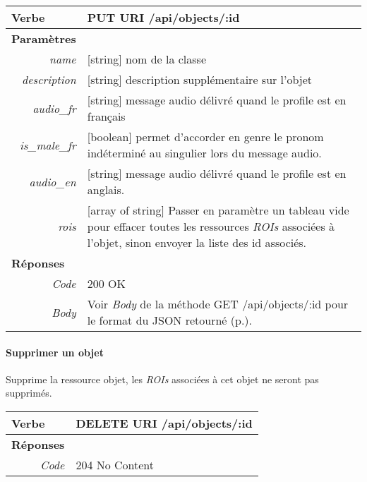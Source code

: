 \begin{appendices}
\begin{absolutelynopagebreak}
\begin{tabular}{@{}p{2cm}p{11.5cm}@{}}
    \toprule
    \textbf{Verbe}                        & PUT \hspace{2.5cm} \textbf{URI} \hspace{0.25cm} /api/objects/:id   \\ \midrule
    \textbf{Paramètres}                   &        \\
    \multicolumn{1}{r}{\textit{name}} & [string] nom de la classe  \\ 
    \multicolumn{1}{r}{\textit{description}} & [string] description supplémentaire sur l'objet  \\ 
    \multicolumn{1}{r}{\textit{audio\_fr}} & [string] message audio délivré quand le profile est en français \\ 
    \multicolumn{1}{r}{\textit{is\_male\_fr}} & [boolean] permet d'accorder en genre le pronom indéterminé au singulier lors du message audio.   \\
    \multicolumn{1}{r}{\textit{audio\_en}} & [string] message audio délivré quand le profile est en anglais.  \\
    \multicolumn{1}{r}{\textit{rois}} & [array of string] Passer en paramètre un tableau vide pour effacer toutes les ressources \emph{ROIs} associées à l'objet, sinon envoyer la liste des id associés. \\ \midrule
    \textbf{Réponses}                     &        \\
    \multicolumn{1}{r}{\textit{Code}}   & 200 OK \\
    \multicolumn{1}{r}{\textit{Body}}   & Voir \emph{Body} de la méthode GET /api/objects/:id pour le format du JSON retourné (p.\pageref{jsonHalObjects}).
    \\ \bottomrule
\end{tabular}
\end{absolutelynopagebreak}

\begin{absolutelynopagebreak}
\paragraph{Supprimer un objet}

Supprime la ressource objet, les \emph{ROIs} associées à cet objet ne seront pas supprimés.

\begin{tabular}{@{}p{2cm}p{11.5cm}@{}}
    \toprule
    \textbf{Verbe}                        & DELETE \hspace{2.5cm} \textbf{URI} \hspace{0.25cm} /api/objects/:id   \\ \midrule
    \textbf{Réponses}                     &        \\
    \multicolumn{1}{r}{\textit{Code}}   & 204 No Content \\ \bottomrule
\end{tabular}
\end{absolutelynopagebreak}


\end{appendices}
